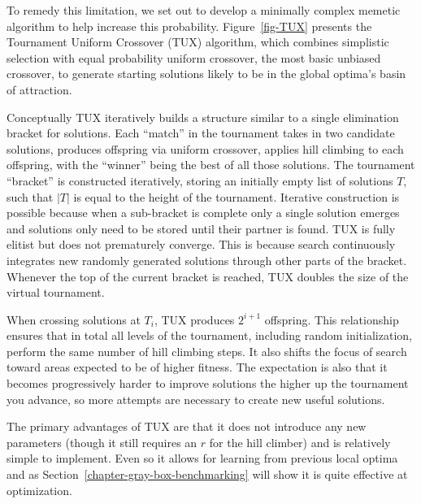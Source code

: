 To remedy this limitation, we set out to develop a minimally complex memetic
algorithm to help increase this probability. Figure~\ref{fig-TUX} presents
the Tournament Uniform Crossover (TUX) algorithm, which combines simplistic
selection with equal probability uniform crossover, the most basic unbiased crossover, to generate starting
solutions likely to be in the global optima's basin of attraction.

Conceptually TUX iteratively builds a structure similar to a single elimination
bracket for solutions. Each ``match'' in the tournament takes in two candidate solutions,
produces offspring via uniform crossover, applies hill climbing to each offspring, with
the ``winner'' being the best of all those solutions. The tournament ``bracket'' is constructed
iteratively, storing an initially empty list of solutions $T$, such that $|T|$ is equal to the height
of the tournament. Iterative construction is possible because when a sub-bracket is complete only a single solution
emerges and solutions only need to be stored until their partner is found.
TUX is fully elitist but does not prematurely converge. This is because search continuously
integrates new randomly generated solutions through other parts of the bracket. Whenever the
top of the current bracket is reached, TUX doubles the size of the virtual tournament.

When crossing solutions at $T_i$, TUX produces $2^{i+1}$ offspring. This relationship
ensures that in total all levels of the tournament, including random initialization,
perform the same number of hill climbing steps. It also shifts the focus of search toward
areas expected to be of higher fitness. The expectation is also that it becomes progressively
harder to improve solutions the higher up the tournament you advance, so more attempts
are necessary to create new useful solutions.

The primary advantages of TUX are that it does not introduce any new parameters (though it still
requires an $r$ for the hill climber) and is relatively simple to implement. Even so
it allows for learning from previous local optima and as Section~\ref{chapter-gray-box-benchmarking}
will show it is quite effective at optimization.
